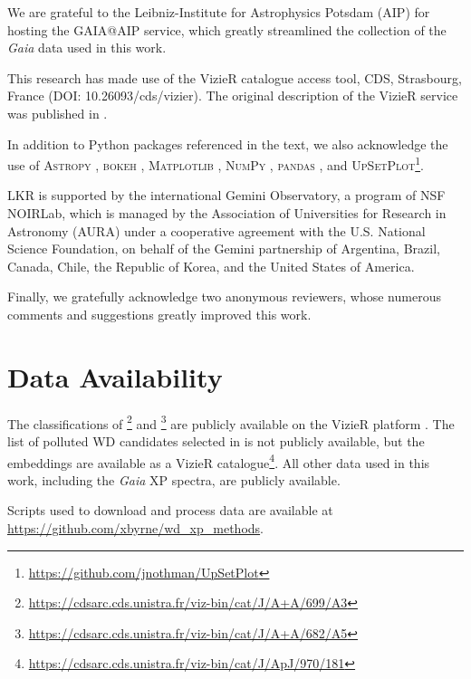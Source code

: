 \documentclass[fleqn,usenatbib]{rasti}
\begin{document}
We are grateful to the Leibniz-Institute for Astrophysics Potsdam (AIP) for hosting the GAIA@AIP service, which greatly streamlined the collection of the \textit{Gaia} data used in this work.

This research has made use of the VizieR catalogue access tool, CDS, Strasbourg, France (DOI: 10.26093/cds/vizier).
The original description of the VizieR service was published in \citet{ochsenbein00}.

In addition to Python packages referenced in the text, we also acknowledge the use of \textsc{Astropy} \citep{astropy1, astropy2, astropy3}, \textsc{bokeh} \citep{bokeh}, \textsc{Matplotlib} \citep{matplotlib}, \textsc{NumPy} \citep{numpy}, \textsc{pandas} \citep{pandas1, pandas2}, and \textsc{UpSetPlot}\footnote{\url{https://github.com/jnothman/UpSetPlot}}.

LKR is supported by the international Gemini Observatory, a program of NSF NOIRLab, which is managed by the Association of Universities for Research in Astronomy (AURA) under a cooperative agreement with the U.S. National Science Foundation, on behalf of the Gemini partnership of Argentina, Brazil, Canada, Chile, the Republic of Korea, and the United States of America.

Finally, we gratefully acknowledge two anonymous reviewers, whose numerous comments and suggestions greatly improved this work.

\section*{Data Availability}

The classifications of \citet{garciazamora25}\footnote{
    \url{https://cdsarc.cds.unistra.fr/viz-bin/cat/J/A+A/699/A3}
} and \citet{vincent24}\footnote{
    \url{https://cdsarc.cds.unistra.fr/viz-bin/cat/J/A+A/682/A5}
} are publicly available on the VizieR platform \citep{ochsenbein00}.
The list of polluted WD candidates selected in \citet{kao24} is not publicly available, but the embeddings are available as a VizieR catalogue\footnote{
    \url{https://cdsarc.cds.unistra.fr/viz-bin/cat/J/ApJ/970/181}
}.
All other data used in this work, including the \textit{Gaia} XP spectra, are publicly available.

Scripts used to download and process data are available at
\url{https://github.com/xbyrne/wd_xp_methods}.

\end{document}
